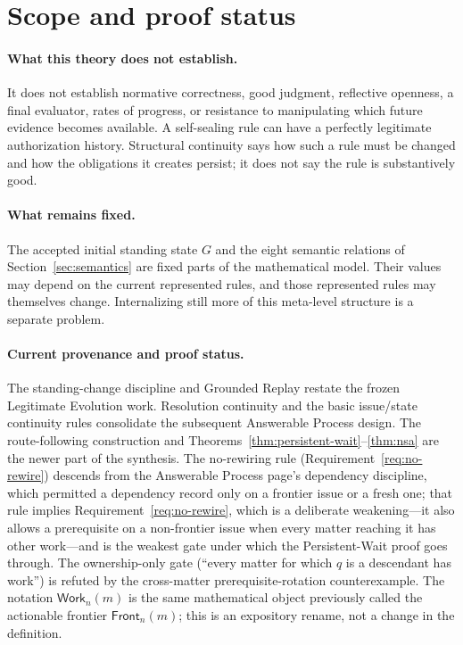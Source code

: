 \documentclass[11pt]{article}
\theoremstyle{definition}
\theoremstyle{remark}
\newcommand{\Work}{\mathsf{Work}}
\begin{document}
\section{Scope and proof status}\label{sec:scope}

\paragraph{What this theory does not establish.}
It does not establish normative correctness, good judgment, reflective
openness, a final evaluator, rates of progress, or resistance to manipulating
which future evidence becomes available. A self-sealing rule can have a
perfectly legitimate authorization history. Structural continuity says how
such a rule must be changed and how the obligations it creates persist; it does
not say the rule is substantively good.

\paragraph{What remains fixed.}
The accepted initial standing state $G$ and the eight semantic relations of
Section~\ref{sec:semantics} are fixed parts of the mathematical model. Their
values may depend on the current represented rules, and those represented rules
may themselves change. Internalizing still more of this meta-level structure is
a separate problem.

\paragraph{Current provenance and proof status.}
The standing-change discipline and Grounded Replay restate the frozen
Legitimate Evolution work. Resolution continuity and the basic issue/state
continuity rules consolidate the subsequent Answerable Process design.
The route-following construction and
Theorems~\ref{thm:persistent-wait}--\ref{thm:nsa} are the newer part of the
synthesis. The no-rewiring rule (Requirement~\ref{req:no-rewire}) descends from
the Answerable Process page's dependency discipline, which permitted a
dependency record only on a frontier issue or a fresh one; that rule implies
Requirement~\ref{req:no-rewire}, which is a deliberate weakening---it also
allows a prerequisite on a non-frontier issue when every matter reaching it has
other work---and is the weakest gate under which the Persistent-Wait proof
goes through. The ownership-only gate (``every matter for which $q$ is a
descendant has work'') is refuted by the cross-matter prerequisite-rotation
counterexample. The notation $\Work_n(m)$ is the same mathematical object
previously called the actionable frontier $\mathsf{Front}_n(m)$; this is an
expository rename, not a change in the definition.
\end{document}

